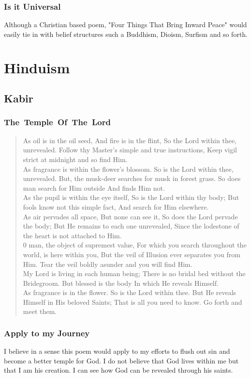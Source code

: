 \documentclass[11pt,a4paper]{scrartcl} %
\begin{document}
\subsubsection{Is it Universal}
Although a Christian based poem, "Four Things That Bring Inward Peace" would easily tie in with belief structures such a Buddhism, Dioism, Surfism and so forth.
    \section{Hinduism}
    \subsection{Kabir}
\subsubsection{The~Temple~Of~The~Lord}
\begin{verse}
As oil is in the oil seed, 
And fire is in the flint,
So the Lord within thee, unrevealed.
Follow thy Master's simple and true instructions,
Keep vigil strict at midnight and so find Him.\\
As fragrance is within the flower's blossom. So is the Lord within thee, unrevealed. But, the musk-deer searches for musk in forest grass. So does man search for Him outside And finds Him not. \\
As the pupil is within the eye itself, So is the Lord within thy body; But fools know not this simple fact, And search for Him elsewhere. \\
As air pervades all space, But none can see it, So does the Lord pervade the body; But He remains to each one unrevealed, Since the lodestone of the heart is not attached to Him. \\
0 man, the object of supremest value, For which you search throughout the world, is here within you, But the veil of Illusion ever separates you from Him. Tear the veil boldly asunder and you will find Him.\\ 
My Lord is living in each human being; There is no bridal bed without the Bridegroom. But blessed is the body In which He reveals Himself.\\ 
As fragrance is in the flower. So is the Lord within thee. But He reveals Himself in His beloved Saints; That is all you need to know. Go forth and meet them. 
\end{verse}
\textcolor{brown}{\citealp[pg. 40-41]{eknath}}

\subsubsection{Apply to my Journey}
I believe in a sense this poem would apply to my efforts to flush out sin and become a better temple for God. I do not believe that God lives within me but that I am his creation. I can see how God can be revealed through his saints.
\end{document}
